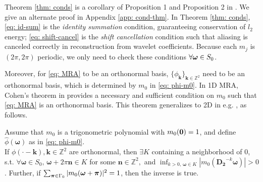 Theorem \ref{thm: conds} is a corollary of Proposition 1 and Proposition 2 in \cite{durand2007}. We give an alternate proof in Appendix \ref{app: cond-thm}.
In Theorem \ref{thm: conds}, \eqref{eq: id-sum} is the {\it identity summation} condition, guaranteeing conservation of $l_2$ energy; \eqref{eq: shift-cancel} is the {\it shift cancellation} condition such that aliasing is canceled correctly in reconstruction from wavelet coefficients. %
Because each $m_j$ is $(2\pi,2\pi)$ periodic, we only need to check these conditions $\forall \boldsymbol{\omega}\in S_0$.

Moreover, for  \eqref{eq: MRA} to be an orthonormal basis,  $\{\phi_{\boldsymbol{k}}\}_{\boldsymbol{k}\in\mathbb{Z}^2}$ need to be an orthonormal basis, which is determined by $m_0$ in \eqref{eq: phi-m0}. In 1D MRA, Cohen's theorem in \cite{cohen1992biorthogonal} provides a necessary and sufficient condition on $m_0$ such that \eqref{eq: MRA} is an orthonormal basis. %
This theorem generalizes to 2D in  e.g. \cite{yin2014orthshear}, as follows.
\begin{thm}\label{thm: basis cond}
Assume that $m_0$ is a trigonometric polynomial with $m_0(\boldsymbol{0})=1$, and define $\hat{\phi}(\boldsymbol{\omega})$ as in \eqref{eq: phi-m0}.\\
If $\phi(\cdot - \boldsymbol{k}),\boldsymbol{k}\in\mathbb{Z}^2$ are orthonormal, then $\exists K$ containing a neighborhood of 0, s.t. $\forall\boldsymbol{\omega}\in S_0,\,\boldsymbol{\omega}+2\pi\mathbf{n}\in K$ for some $\mathbf{n}\in\mathbb{Z}^2, $ and $\inf_{k>0,\,\boldsymbol{\omega}\in K}|m_0(\mathbf{D_2}^{-k}\boldsymbol{\omega})| >0$. 
 Further, if $\sum_{\boldsymbol{\boldsymbol{\pi}}\in \Gamma_0} |m_0(\boldsymbol{\omega}+\boldsymbol{\pi})|^2 = 1$, then the inverse is true.
\end{thm}

